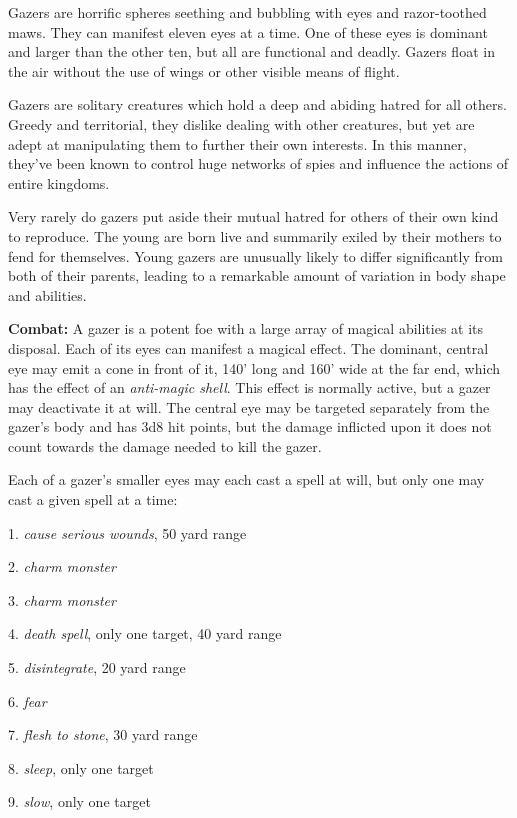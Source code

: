 \begin{multicols}{2}
\begin{minipage}{\columnwidth}
\end{minipage}

Gazers are horrific spheres seething and bubbling with eyes and razor-toothed maws. They can manifest eleven eyes at a time. One of these eyes is dominant and larger than the other ten, but all are functional and deadly. Gazers float in the air without the use of wings or other visible means of flight.

Gazers are solitary creatures which hold a deep and abiding hatred for all others. Greedy and territorial, they dislike dealing with other creatures, but yet are adept at manipulating them to further their own interests. In this manner, they've been known to control huge networks of spies and influence the actions of entire kingdoms.

Very rarely do gazers put aside their mutual hatred for others of their own kind to reproduce. The young are born live and summarily exiled by their mothers to fend for themselves. Young gazers are unusually likely to differ significantly from both of their parents, leading to a remarkable amount of variation in body shape and abilities.

\textbf{Combat:} A gazer is a potent foe with a large array of magical abilities at its disposal. Each of its eyes can manifest a magical effect. The dominant, central eye may emit a cone in front of it, 140' long and 160' wide at the far end, which has the effect of an \textit{anti-magic shell}. This effect is normally active, but a gazer may deactivate it at will. The central eye may be targeted separately from the gazer's body and has 3d8 hit points, but the damage inflicted upon it does not count towards the damage needed to kill the gazer.

Each of a gazer's smaller eyes may each cast a spell at will, but only one may cast a given spell at a time:

1. \textit{cause serious wounds}, 50 yard range

2. \textit{charm monster}

3. \textit{charm monster}

4. \textit{death spell}, only one target, 40 yard range

5. \textit{disintegrate}, 20 yard range

6. \textit{fear}

7. \textit{flesh to stone}, 30 yard range

8. \textit{sleep}, only one target

9. \textit{slow}, only one target


\end{multicols}
